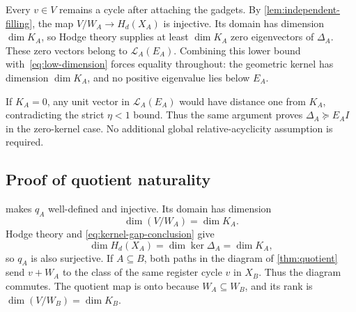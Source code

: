 Every \(v\in V\) remains a cycle after attaching the gadgets. By \cref{lem:independent-filling}, the map \(V/W_A\to H_d(X_A)\) is injective. Its domain has dimension \(\dim K_A\), so Hodge theory supplies at least \(\dim K_A\) zero eigenvectors of \(\Delta_A\). These zero vectors belong to \(\mathcal L_A(E_A)\). Combining this lower bound with~\cref{eq:low-dimension} forces equality throughout: the geometric kernel has dimension \(\dim K_A\), and no positive eigenvalue lies below \(E_A\).

If \(K_A=0\), any unit vector in \(\mathcal L_A(E_A)\) would have distance one from \(K_A\), contradicting the strict \(\eta<1\) bound. Thus the same argument proves \(\Delta_A\succeq E_AI\) in the zero-kernel case. No additional global relative-acyclicity assumption is required.

\subsection{Proof of quotient naturality}
\label{app:quotient-proof}

 makes \(q_A\) well-defined and injective.
Its domain has dimension
\[
\dim(V/W_A)=\dim K_A.
\]
Hodge theory and
\cref{eq:kernel-gap-conclusion} give
\[
\dim H_d(X_A)=\dim\ker\Delta_A=\dim K_A,
\]
so \(q_A\) is also surjective.  If \(A\subseteq B\), both paths in the
diagram of \cref{thm:quotient} send \(v+W_A\) to the class of the same
register cycle \(v\) in \(X_B\).  Thus the diagram commutes.  The quotient
map is onto because \(W_A\subseteq W_B\), and its rank is
\(\dim(V/W_B)=\dim K_B\).
